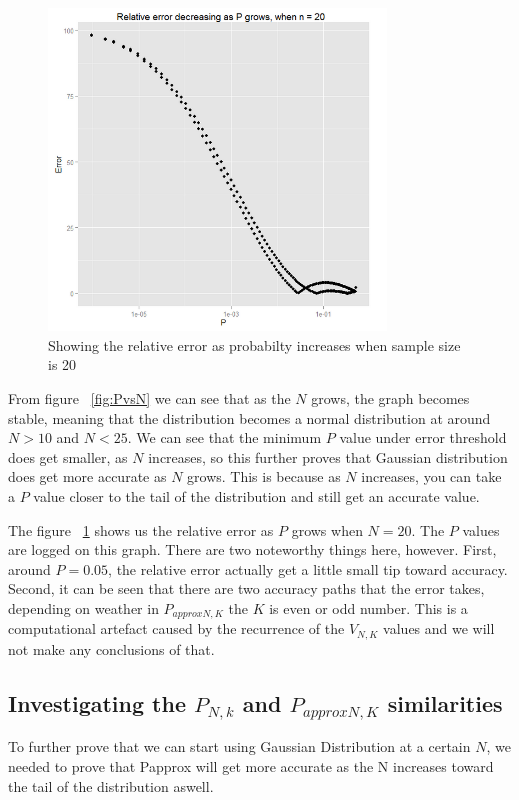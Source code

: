 \documentclass[12pt]{article}
\begin{document}
\begin{figure}[!h]
	\centering
  \includegraphics[width=0.8\textwidth]{RelativeErrorDecreasingPgrowsN20}
	\caption{Showing the relative error as probabilty increases when sample size is 20}
	\label{fig:RelativeErrorDecresingPgrows}
\end{figure}

From figure ~\ref{fig:PvsN} we can see that as the $N$ grows, the graph becomes stable, meaning that the distribution becomes a normal distribution at around $N > 10$ and $N < 25$. We can see that the minimum $P$ value under error threshold does get smaller, as $N$ increases, so this further proves that Gaussian distribution does get more accurate as $N$ grows. This is because as $N$ increases, you can take a $P$ value closer to the tail of the distribution and still get an accurate value.

The figure ~\ref{fig:RelativeErrorDecresingPgrows} shows us the relative error as $P$ grows when $N = 20$. The $P$ values are logged on this graph. There are two noteworthy things here, however. First, around $P = 0.05$, the relative error actually get a little small tip toward accuracy. Second, it can be seen that there are two accuracy paths that the error takes, depending on weather in $P_{approx N, K}$  the $K$ is even or odd number. This is a computational artefact caused by the recurrence of the $V_{N, K}$ values and we will not make any conclusions of that.

\subsection{Investigating the $P_{N, k}$ and $P_{approx N, K}$ similarities}
To further prove that we can start using Gaussian Distribution at a certain $N$, we needed to prove that Papprox will get more accurate as the N increases toward the tail of the distribution aswell.
\end{document}
